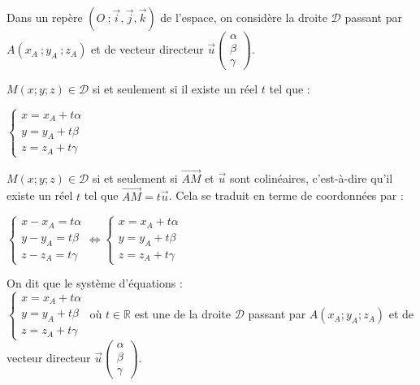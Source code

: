 \begin{propriete}
  Dans un repère $(O\ ;\vec{i},\vec{j},\vec{k})$ de l'espace, on
  considère la droite $\mathscr{D}$ passant par $A(x_A\ ;y_A\ ;z_A)$
  et de vecteur directeur
  $\vec{u} \begin {pmatrix} \alpha\\\beta\\\gamma \end{pmatrix}$.

  $M(x;y;z)\in \mathscr{D}$ si et seulement si il existe un réel $t$
  tel que :
  \begin{center}
    $\begin{cases}x=x_A+t\alpha \\y=y_A+t\beta
      \\z=z_A+t\gamma \end{cases}$
  \end{center}
\end{propriete}

\begin{preuve}
  $M(x;y;z)\in \mathscr{D}$ si et seulement si $\overrightarrow{AM}$
  et $\vec{u}$ sont colinéaires, c'est-à-dire qu'il existe un réel $t$
  tel que $\overrightarrow{AM}=t\overrightarrow{u}$.  Cela se traduit
  en terme de coordonnées par :

  $\begin{cases}x-x_A=t\alpha \\y-y_A=t\beta
    \\z-z_A=t\gamma \end{cases}\Leftrightarrow\begin{cases}x=x_A+t\alpha
    \\y=y_A+t\beta \\z=z_A+t\gamma \end{cases}$
\end{preuve}

\begin{definition}
  On dit que le système d'équations : \\
  $\begin{cases}
    x=x_A+t\alpha    \\
    y=y_A+t\beta \\
    z=z_A+t\gamma 
  \end{cases}$
  où $t\in\mathbb{R}$ est une  de la droite $\mathscr{D}$ passant par
  $A(x_A;y_A;z_A)$ et de vecteur directeur $\vec{u}
  \begin {pmatrix} 
    \alpha\\
    \beta\\
    \gamma 
  \end{pmatrix}$.
\end{definition}

